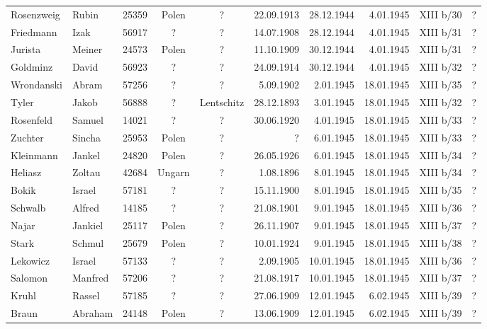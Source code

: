 \documentclass[a4paper,12pt,ngerman,
]{nisebook}
\begin{document}
\begin{tiny}
\begin{longtable}[l]{|l|l|r|c|c|r|r|r|c|r|}
Rosenzweig  &  Rubin  & 25359 &  Polen  &  ?  & 22.09.1913 & 28.12.1944 & 4.01.1945 &  XIII b/30  &  ? \\[3pt]
Friedmann  &  Izak  & 56917 &  ?  &  ?  & 14.07.1908 & 28.12.1944 & 4.01.1945 &  XIII b/31  &  ? \\[3pt]
Jurista  &  Meiner  & 24573 &  Polen  &  ?  & 11.10.1909 & 30.12.1944 & 4.01.1945 &  XIII b/31  &  ? \\[3pt]
Goldminz  &  David  & 56923 &  ?  &  ?  & 24.09.1914 & 30.12.1944 & 4.01.1945 &  XIII b/32  &  ? \\[3pt]
Wrondanski  &  Abram  & 57256 &  ?  &  ?  & 5.09.1902 & 2.01.1945 & 18.01.1945 &  XIII b/35  &  ? \\[3pt]
Tyler  &  Jakob  & 56888 &  ?  &  Lentschitz  & 28.12.1893 & 3.01.1945 & 18.01.1945 &  XIII b/32  &  ? \\[3pt]
Rosenfeld  &  Samuel  & 14021 &  ?  &  ?  & 30.06.1920 & 4.01.1945 & 18.01.1945 &  XIII b/33  &  ? \\[3pt]
Zuchter  &  Sincha  & 25953 &  Polen  &  ?  & ?  & 6.01.1945 & 18.01.1945 &  XIII b/33  &  ? \\[3pt]
Kleinmann  &  Jankel  & 24820 &  Polen  &  ?  & 26.05.1926 & 6.01.1945 & 18.01.1945 &  XIII b/34  &  ? \\[3pt]
Heliasz  &  Zoltau  & 42684 &  Ungarn  &  ?  & 1.08.1896 & 8.01.1945 & 18.01.1945 &  XIII b/34  &  ? \\[3pt]
Bokik  &  Israel  & 57181 &  ?  &  ?  & 15.11.1900 & 8.01.1945 & 18.01.1945 &  XIII b/35  &  ? \\[3pt]
Schwalb  &  Alfred  & 14185 &  ?  &  ?  & 21.08.1901 & 9.01.1945 & 18.01.1945 &  XIII b/36  &  ? \\[3pt]
Najar  &  Jankiel  & 25117 &  Polen  &  ?  & 26.11.1907 & 9.01.1945 & 18.01.1945 &  XIII b/37  &  ? \\[3pt]
Stark  &  Schmul  & 25679 &  Polen  &  ?  & 10.01.1924 & 9.01.1945 & 18.01.1945 &  XIII b/38  &  ? \\[3pt]
Lekowicz  &  Israel  & 57133 &  ?  &  ?  & 2.09.1905 & 10.01.1945 & 18.01.1945 &  XIII b/36  &  ? \\[3pt]
Salomon  &  Manfred  & 57206 &  ?  &  ?  & 21.08.1917 & 10.01.1945 & 18.01.1945 &  XIII b/37  &  ? \\[3pt]
Kruhl  &  Rassel  & 57185 &  ?  &  ?  & 27.06.1909 & 12.01.1945 & 6.02.1945 &  XIII b/39  &  ? \\[3pt]
Braun   &  Abraham  & 24148 &  Polen  &  ?  & 13.06.1909 & 12.01.1945 & 6.02.1945 &  XIII b/39  &  ? \\[3pt]

\end{longtable}
\end{tiny}
\end{document}
